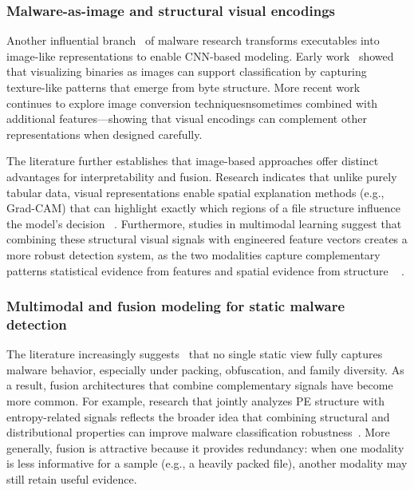\documentclass[conference]{IEEEtran}
\begin{document}
\subsubsection{Malware-as-image and structural visual encodings}

Another influential branch~\cite{NKJMB2011} \cite{KBSSSK2025} of malware research transforms executables into image-like representations to enable CNN-based modeling. Early work~\cite{NKJMB2011} showed that visualizing binaries as images can support classification by capturing texture-like patterns that emerge from byte structure. More recent work~\cite{ZLSC2024} continues to explore image conversion techniquesnsometimes combined with additional features---showing that visual encodings can complement other representations when designed carefully.

The literature further establishes that image-based approaches offer distinct advantages for interpretability and fusion. Research indicates that unlike purely tabular data, visual representations enable spatial explanation methods (e.g., Grad-CAM) that can highlight exactly which regions of a file structure influence the model's decision~\cite{SCDVPB2017} \cite{ZLSC2024}. Furthermore, studies in multimodal learning suggest that combining these structural visual signals with engineered feature vectors creates a more robust detection system, as the two modalities capture complementary patterns statistical evidence from features and spatial evidence from structure ~\cite{NKJMB2011} \cite{ZLSC2024}.

\subsubsection{Multimodal and fusion modeling for static malware detection}

The literature increasingly suggests~\cite{ZLSC2024} \cite{KBSSSK2025} that no single static view fully captures malware behavior, especially under packing, obfuscation, and family diversity. As a result, fusion architectures that combine complementary signals have become more common. For example, research that jointly analyzes PE structure with entropy-related signals reflects the broader idea that combining structural and distributional properties can improve malware classification robustness~\cite{SZS25}. More generally, fusion is attractive because it provides redundancy: when one modality is less informative for a sample (e.g., a heavily packed file), another modality may still retain useful evidence.
\end{document}
